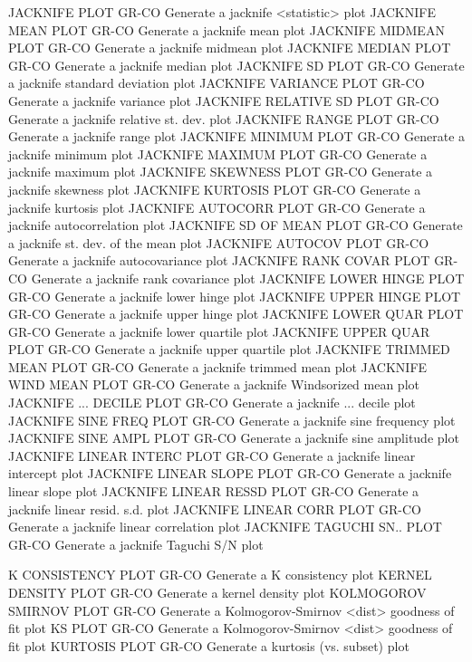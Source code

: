 JACKNIFE PLOT               GR-CO Generate a jacknife <statistic> plot
JACKNIFE MEAN PLOT          GR-CO Generate a jacknife mean plot
JACKNIFE MIDMEAN PLOT       GR-CO Generate a jacknife midmean plot
JACKNIFE MEDIAN PLOT        GR-CO Generate a jacknife median plot
JACKNIFE SD PLOT            GR-CO Generate a jacknife standard deviation plot
JACKNIFE VARIANCE PLOT      GR-CO Generate a jacknife variance plot
JACKNIFE RELATIVE SD PLOT   GR-CO Generate a jacknife relative st. dev. plot
JACKNIFE RANGE PLOT         GR-CO Generate a jacknife range plot
JACKNIFE MINIMUM PLOT       GR-CO Generate a jacknife minimum plot
JACKNIFE MAXIMUM PLOT       GR-CO Generate a jacknife maximum plot
JACKNIFE SKEWNESS PLOT      GR-CO Generate a jacknife skewness plot
JACKNIFE KURTOSIS PLOT      GR-CO Generate a jacknife kurtosis plot
JACKNIFE AUTOCORR PLOT      GR-CO Generate a jacknife autocorrelation plot
JACKNIFE SD OF MEAN PLOT    GR-CO Generate a jacknife st. dev. of the mean plot
JACKNIFE AUTOCOV PLOT       GR-CO Generate a jacknife autocovariance plot
JACKNIFE RANK COVAR PLOT    GR-CO Generate a jacknife rank covariance plot
JACKNIFE LOWER HINGE PLOT   GR-CO Generate a jacknife lower hinge plot
JACKNIFE UPPER HINGE PLOT   GR-CO Generate a jacknife upper hinge plot
JACKNIFE LOWER QUAR PLOT    GR-CO Generate a jacknife lower quartile plot
JACKNIFE UPPER QUAR PLOT    GR-CO Generate a jacknife upper quartile plot
JACKNIFE TRIMMED MEAN PLOT  GR-CO Generate a jacknife trimmed mean plot
JACKNIFE WIND MEAN PLOT     GR-CO Generate a jacknife Windsorized mean plot
JACKNIFE ... DECILE PLOT    GR-CO Generate a jacknife ... decile plot
JACKNIFE SINE FREQ PLOT     GR-CO Generate a jacknife sine frequency plot
JACKNIFE SINE AMPL PLOT     GR-CO Generate a jacknife sine amplitude plot
JACKNIFE LINEAR INTERC PLOT GR-CO Generate a jacknife linear intercept plot
JACKNIFE LINEAR SLOPE PLOT  GR-CO Generate a jacknife linear slope plot
JACKNIFE LINEAR RESSD PLOT  GR-CO Generate a jacknife linear resid. s.d. plot
JACKNIFE LINEAR CORR PLOT   GR-CO Generate a jacknife linear correlation plot
JACKNIFE TAGUCHI SN.. PLOT  GR-CO Generate a jacknife Taguchi S/N plot

K CONSISTENCY PLOT          GR-CO Generate a K consistency plot
KERNEL DENSITY PLOT         GR-CO Generate a kernel density plot
KOLMOGOROV SMIRNOV PLOT     GR-CO Generate a Kolmogorov-Smirnov <dist> goodness of fit plot
KS PLOT                     GR-CO Generate a Kolmogorov-Smirnov <dist> goodness of fit plot
KURTOSIS PLOT               GR-CO Generate a kurtosis (vs. subset) plot

